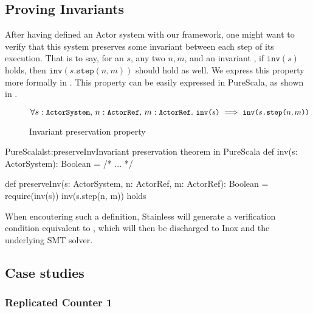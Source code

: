 \subsection{Proving Invariants}
\label{invariants}

After having defined an Actor system with our framework, one might want to verify that this 
system preserves some invariant between each step of its execution. That is to say, 
for an  $s$, any two \ActorRef $n, m$,
and an invariant , if $\texttt{inv}(s)$ holds, 
then $\texttt{inv}(s\texttt{.step}(n, m))$ should hold as well. We express this 
property more formally in . This property can be easily expressed in PureScala, as shown in .

\begin{figure}[!h]
$$\forall s: \texttt{\small{ActorSystem}},\, n: \texttt{\small{ActorRef}},\, m: \texttt{\small{ActorRef}}.\ \texttt{\small{inv($s$)}} \implies \texttt{\small{inv($s$.step($n, m$))}}$$
\vspace{-20pt}
\caption{Invariant preservation property\label{fig:stepinvariant}}
\end{figure}

\begin{Code}{PureScala}{lst:preserveInv}{Invariant preservation theorem in PureScala}
def inv(s: ActorSystem): Boolean = {
  /* ... */
}

def preserveInv(s: ActorSystem, n: ActorRef, m: ActorRef): Boolean = {
  require(inv(s))
  inv(s.step(n, m))
} holds
\end{Code}

When encoutering such a definition, Stainless will generate a verification condition 
equivalent to , which will then be discharged to Inox and the underlying SMT solver.

%

\subsection{Case studies}
\label{casestudies}

\subsubsection*{Replicated Counter 1}
\label{repcounterinc}

